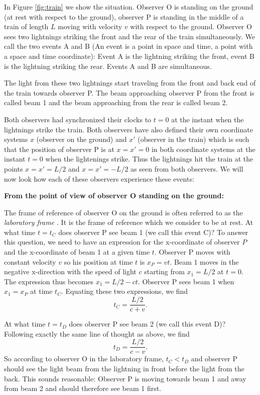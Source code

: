 {\begin{multicols}{2}
In Figure \ref{fig:train} we show the situation. Observer O is standing on the ground (at rest with respect to the ground), observer P is standing in the middle of a train of length $L$ moving with velocity $v$ with respect to the ground. Observer O sees two lightnings striking the front and the rear of the train simultaneously. We call the two events A and B (An event is a point in space and time, a point with a space and time coordinate): Event A is the lightning striking the front, event B is the lightning striking the rear. Events A and B are simultaneous. 

The light from these two lightnings start traveling from the front and back end of the train towards observer P. The beam approaching observer P from the front is called beam 1 and the beam approaching from the rear is called beam 2. 

Both observers had synchronized their clocks to $t=0$ at the instant when the lightnings strike the train. Both observers have also defined their own coordinate systems $x$ (observer on the ground) and $x'$ (observer in the train) which is such that the position of observer P is at $x=x'=0$ in both coordinate systems at the instant $t=0$ when the lightenings strike. Thus the lightnings hit the train at the points $x=x'=L/2$ and $x=x'=-L/2$ as seen from both observers. We will now look how each of these observers experience these events:

{\bf From the point of view of observer O standing on the ground:}

The frame of reference of observer O on the ground is often referred to as the {\it laboratory frame \label{pg:labframe}}. It is the frame of reference which we consider to be at rest. At what time $t=t_C$ does observer P see beam 1 (we call this event C)? To answer this question, we need to have an expression for the x-coordinate of observer $P$ and the x-coordinate of beam 1 at a given time $t$. Observer P moves with constant velocity $v$ so his position at time $t$ is $x_P=vt$. Beam 1 moves in the negative x-direction with the speed of light $c$ starting from $x_1=L/2$ at $t=0$. The expression thus becomes $x_1=L/2-ct$. Observer P sees beam 1 when $x_1=x_P$ at time $t_C$. Equating these two expressions, we find
\begin{equation}
\label{eq:tc}
t_C=\frac{L/2}{c+v}.
\end{equation}

At what time $t=t_D$ does observer P see beam 2 (we call this event D)? Following exactly the same line of thought as above, we find
\begin{equation}
\label{eq:td}
t_D=\frac{L/2}{c-v}.
\end{equation}
So according to observer O in the laboratory frame, $t_C<t_D$ and observer P should see the light beam from the lightning in front before the light from the back. This sounds reasonable: Observer P is moving towards beam 1 and away from beam 2 and should therefore see beam 1 first.


\end{multicols}}
